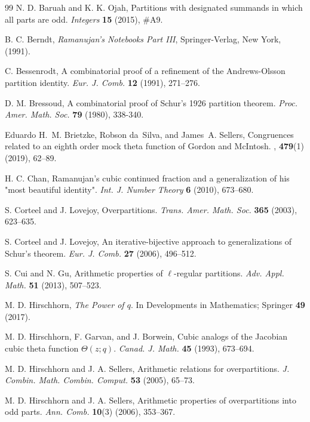\documentclass[12pt]{amsart}
\theoremstyle{plain}
\theoremstyle{definition}
\begin{document}
\begin{thebibliography}{99}
 N. D. Baruah and K. K. Ojah, Partitions with designated summands in which all parts are odd. \textit{Integers} \textbf{15} (2015), \#A9.

  B. C. Berndt, {\it Ramanujan's Notebooks Part III}, Springer-Verlag, New York, (1991).

 C. Bessenrodt, A combinatorial proof of a refinement of the Andrews-Olsson partition identity. \textit{Eur. J. Comb.} \textbf{12} (1991), 271--276.

 D. M. Bressoud, A combinatorial proof of Schur's 1926 partition theorem. \textit{Proc. Amer. Math. Soc.} \textbf{79} (1980), 338-340.

Eduardo H.~M. Brietzke, Robson da~Silva, and James~A. Sellers,
\newblock Congruences related to an eighth order mock theta function of {G}ordon and {M}c{I}ntosh.
, \textbf{479}(1) (2019), 62--89.


 H. C. Chan, Ramanujan's cubic continued fraction and a generalization of his "most beautiful identity". \textit{Int. J. Number Theory} \textbf{6} (2010),  673--680.

 S. Corteel and J. Lovejoy,  Overpartitions. \textit{Trans. Amer. Math. Soc.} \textbf{365} (2003), 623--635.

 S. Corteel and J. Lovejoy, An iterative-bijective approach to generalizations of Schur's theorem.\textit{ Eur. J. Comb.} \textbf{27} (2006), 496--512.

 S. Cui and N. Gu, Arithmetic properties of $\ell$-regular partitions. \textit{Adv. Appl. Math.} {\bf 51} (2013), 507--523.



 M. D. Hirschhorn, \emph{The Power of $q$}. In Developments in Mathematics; Springer \textbf{49} (2017).


 M. D. Hirschhorn, F. Garvan, and J. Borwein, Cubic analogs of the Jacobian cubic theta function $\Theta(z;q)$. \textit{Canad. J. Math.} \textbf{45} (1993), 673--694.

 M. D. Hirschhorn and J. A. Sellers, Arithmetic relations for overpartitions. \textit{J. Combin. Math. Combin. Comput.} {\bf 53} (2005), 65--73.


 M. D. Hirschhorn and J. A. Sellers, Arithmetic properties of overpartitions into odd parts. \textit{Ann. Comb.} {\bf 10}(3) (2006), 353--367.


\end{thebibliography}
\end{document}
